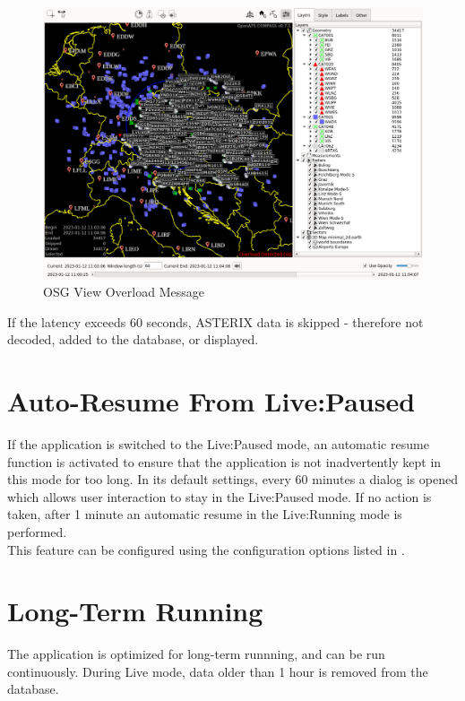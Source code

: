 \begin{figure}[H]
    \hspace*{-2.5cm}
    \includegraphics[width=19cm,frame]{figures/osgview_overload.png}
  \caption{OSG View Overload Message}
\end{figure} 

If the latency exceeds 60 seconds, ASTERIX data is skipped - therefore not decoded, added to the database, or displayed.

\section{Auto-Resume From Live:Paused}

If the application is switched to the Live:Paused mode, an automatic resume function is activated to ensure that the application is not inadvertently kept in this mode for too long. In its default settings, every 60 minutes a dialog is opened which allows user interaction to stay in the Live:Paused mode. If no action is taken, after 1 minute an automatic resume in the Live:Running mode is performed. \\

This feature can be configured using the configuration options listed in .

\section{Long-Term Running}

The application is optimized for long-term runnning, and can be run continuously. During Live mode, data older than 1 hour is removed from the database. \\

